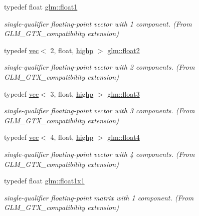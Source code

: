 \begin{DoxyCompactItemize}
typedef float \mbox{\hyperlink{group__gtx__compatibility_gae0ad1b0450320cda98bbbecb56bc3167}{glm\+::float1}}
\begin{DoxyCompactList}\small\item\em single-\/qualifier floating-\/point vector with 1 component. (From G\+L\+M\+\_\+\+G\+T\+X\+\_\+compatibility extension) \end{DoxyCompactList}\item 
typedef \mbox{\hyperlink{structglm_1_1vec}{vec}}$<$ 2, float, \mbox{\hyperlink{namespaceglm_a36ed105b07c7746804d7fdc7cc90ff25ac6f7eab42eacbb10d59a58e95e362074}{highp}} $>$ \mbox{\hyperlink{group__gtx__compatibility_gaba973334bf704aa382f9b0dc06b59cf8}{glm\+::float2}}
\begin{DoxyCompactList}\small\item\em single-\/qualifier floating-\/point vector with 2 components. (From G\+L\+M\+\_\+\+G\+T\+X\+\_\+compatibility extension) \end{DoxyCompactList}\item 
typedef \mbox{\hyperlink{structglm_1_1vec}{vec}}$<$ 3, float, \mbox{\hyperlink{namespaceglm_a36ed105b07c7746804d7fdc7cc90ff25ac6f7eab42eacbb10d59a58e95e362074}{highp}} $>$ \mbox{\hyperlink{group__gtx__compatibility_ga8bbd0db121b50b0904f9a23adb3bbc45}{glm\+::float3}}
\begin{DoxyCompactList}\small\item\em single-\/qualifier floating-\/point vector with 3 components. (From G\+L\+M\+\_\+\+G\+T\+X\+\_\+compatibility extension) \end{DoxyCompactList}\item 
typedef \mbox{\hyperlink{structglm_1_1vec}{vec}}$<$ 4, float, \mbox{\hyperlink{namespaceglm_a36ed105b07c7746804d7fdc7cc90ff25ac6f7eab42eacbb10d59a58e95e362074}{highp}} $>$ \mbox{\hyperlink{group__gtx__compatibility_ga5b28e8af9bfee363940882dd7d1214b5}{glm\+::float4}}
\begin{DoxyCompactList}\small\item\em single-\/qualifier floating-\/point vector with 4 components. (From G\+L\+M\+\_\+\+G\+T\+X\+\_\+compatibility extension) \end{DoxyCompactList}\item 
typedef float \mbox{\hyperlink{group__gtx__compatibility_gaac1faa940ac1fbb32d4a315005b578af}{glm\+::float1x1}}
\begin{DoxyCompactList}\small\item\em single-\/qualifier floating-\/point matrix with 1 component. (From G\+L\+M\+\_\+\+G\+T\+X\+\_\+compatibility extension) \end{DoxyCompactList}\item 

\end{DoxyCompactItemize}

